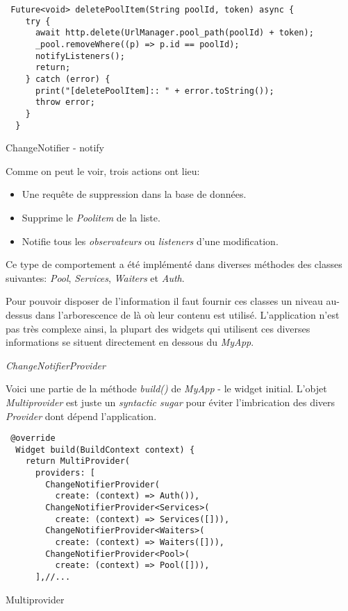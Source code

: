 \begin{listing}[!h]
\begin{verbatim}
 Future<void> deletePoolItem(String poolId, token) async {
    try {
      await http.delete(UrlManager.pool_path(poolId) + token);
      _pool.removeWhere((p) => p.id == poolId);
      notifyListeners();
      return;
    } catch (error) {
      print("[deletePoolItem]:: " + error.toString());
      throw error;
    }
  }
\end{verbatim}
\caption{ChangeNotifier - notify}
\label{code:changeNotifierNotify}
\end{listing}

Comme on peut le voir, trois actions ont lieu:
\smallskip
\begin{itemize}
    \item Une requête de suppression dans la base de données.
    \item Supprime le \textit{Poolitem} de la liste.
    \item Notifie tous les \textit{observateurs} ou \textit{listeners} d'une modification.
\end{itemize}
\smallskip
Ce type de comportement a été implémenté dans diverses méthodes des classes suivantes: \textit{Pool}, \textit{Services}, \textit{Waiters} et \textit{Auth}.

Pour pouvoir disposer de l'information il faut fournir ces classes un niveau au-dessus dans l'arborescence de là où leur contenu est utilisé. L'application n'est pas très complexe ainsi, la plupart des widgets qui utilisent ces diverses informations se situent directement en dessous du \textit{MyApp}.

\emph{ChangeNotifierProvider}

Voici une partie de la méthode \textit{build()} de \textit{MyApp} - le widget initial.
L'objet \textit{Multiprovider} est juste un \textit{syntactic sugar} pour éviter l'imbrication des divers \textit{Provider} dont dépend l'application.
\begin{listing}[!h]
\begin{verbatim}
 @override
  Widget build(BuildContext context) {
    return MultiProvider(
      providers: [
        ChangeNotifierProvider(
          create: (context) => Auth()),
        ChangeNotifierProvider<Services>(
          create: (context) => Services([])),
        ChangeNotifierProvider<Waiters>(
          create: (context) => Waiters([])),
        ChangeNotifierProvider<Pool>(
          create: (context) => Pool([])),
      ],//...
\end{verbatim}
\caption{Multiprovider}
\label{code:multiprovider}
\end{listing}

